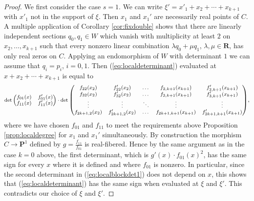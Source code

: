 \documentclass[12pt]{amsart}
\numberwithin{equation}{section}
\numberwithin{thmcounter}{section}
\theoremstyle{definition}
\theoremstyle{claim}
\newcommand{\nR}{\mathbf{R}}
\newcommand{\nP}{\mathbf{P}}
\begin{document}
\begin{proof}
\medskip

\noindent    We first consider the case $s=1$. We can write $\xi'=x'_1+x_2+\cdots+x_{k+1}$ with $x'_1$ not in the support of $\xi$. Then $x_1$ and $x_1'$ are necessarily real points of $C$. A multiple application of Corollary \ref{cor:fixdouble} shows that there are linearly independent sections $q_0,q_1\in W$ which vanish with multiplicity at least $2$ on $x_2,\ldots,x_{k+1}$ such that every nonzero linear combination $\lambda q_0+\mu q_1$, $\lambda,\mu\in\nR$, has only real zeros on $C$. Applying an endomorphism of $W$ with determinant $1$ we can assume that $q_i=p_i$, $i=0,1$. Then (\ref{eq:localdeterminant}) evaluated at $x+x_2+\cdots+x_{k+1}$ is equal to
\begin{equation}\label{eq:localblockdet1}
       \text{\footnotesize\(\det
        \begin{pmatrix}
		f_{01}(x) & f'_{01}(x)  \\
		f_{11}(x) & f'_{11}(x)
	\end{pmatrix}\cdot\det
        \begin{pmatrix}
		 f_{22}(x_2) & f'_{22}(x_2)& \dots & f_{2,k+1}(x_{k+1}) & f'_{2,k+1}(x_{k+1}) \\
		 f_{32}(x_2) & f'_{32}(x_2)& \dots & f_{3,k+1}(x_{k+1}) & f'_{3,k+1}(x_{k+1}) \\
		\vdots & \vdots & \ddots & \vdots & \vdots \\
		 f_{2k+1,2}(x_2) & f'_{2k+1,2}(x_2)& \dots & f_{2k+1,k+1}(x_{k+1}) & f'_{2k+1,k+1}(x_{k+1})
	\end{pmatrix}\)},
	\end{equation}
    where we have chosen $f_{01}$ and $f_{11}$ to meet the requirements above Proposition \ref{prop:localdegree} for $x_1$ and $x_1'$ simultaneously. By construction the morphism $C\to\nP^1$ defined by $g=\frac{f_{11}}{f_{01}}$ is real-fibered. Hence by the same argument as in the case $k=0$ above, the first determinant, which is $g'(x)\cdot f_{01}(x)^2$, has the same sign for every $x$ where it is defined and where $f_{01}$ is nonzero. In particular, since the second determinant in (\ref{eq:localblockdet1}) does not depend on $x$, this shows that (\ref{eq:localdeterminant}) has the same sign when evaluated at $\xi$ and $\xi'$. This contradicts our choice of $\xi$ and $\xi'$.

\medskip


\end{proof}
\end{document}
